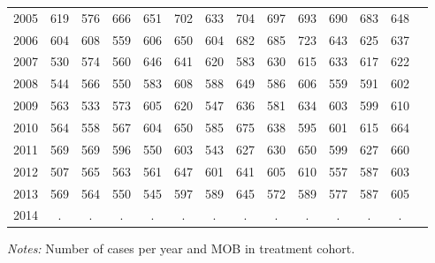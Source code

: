 \begin{table}[H]
\begin{threeparttable}
{\begin{tabular}{l*{13}{c}}
2005        &         619&         576&         666&         651&         702&         633&         704&         697&         693&         690&         683&         648\\
2006        &         604&         608&         559&         606&         650&         604&         682&         685&         723&         643&         625&         637\\
2007        &         530&         574&         560&         646&         641&         620&         583&         630&         615&         633&         617&         622\\
2008        &         544&         566&         550&         583&         608&         588&         649&         586&         606&         559&         591&         602\\
2009        &         563&         533&         573&         605&         620&         547&         636&         581&         634&         603&         599&         610\\
2010        &         564&         558&         567&         604&         650&         585&         675&         638&         595&         601&         615&         664\\
2011        &         569&         569&         596&         550&         603&         543&         627&         630&         650&         599&         627&         660\\
2012        &         507&         565&         563&         561&         647&         601&         641&         605&         610&         557&         587&         603\\
2013        &         569&         564&         550&         545&         597&         589&         645&         572&         589&         577&         587&         605\\
2014        &           .&           .&           .&           .&           .&           .&           .&           .&           .&           .&           .&           .\\
 \bottomrule \end{tabular} } \begin{tablenotes} \item \scriptsize \emph{Notes:} Number of cases per year and MOB in treatment cohort. \end{tablenotes} \end{threeparttable} \end{table} 
